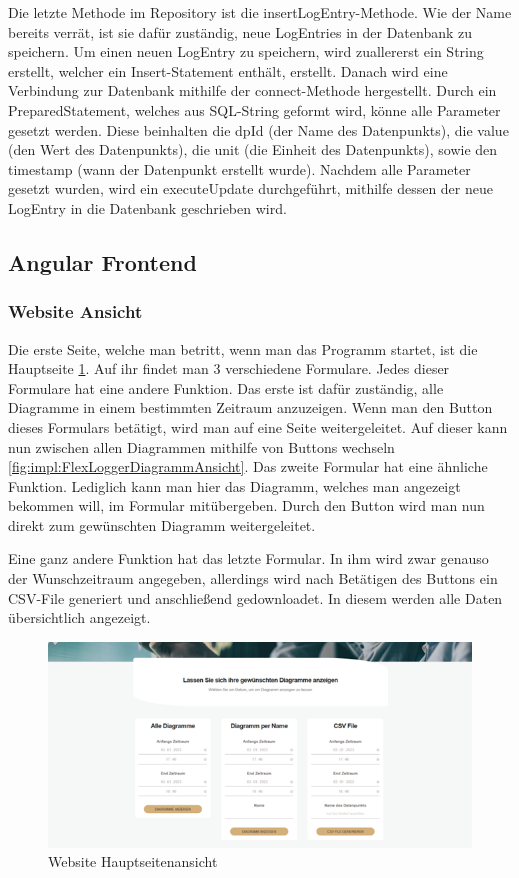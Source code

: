 Die letzte Methode im Repository ist die insertLogEntry-Methode. Wie der Name bereits verrät, ist sie dafür zuständig, neue LogEntries in der Datenbank zu speichern. Um einen neuen LogEntry zu speichern, wird zuallererst ein String erstellt, welcher ein Insert-Statement enthält, erstellt. 
Danach wird eine Verbindung zur Datenbank mithilfe der connect-Methode hergestellt. Durch ein PreparedStatement, welches aus SQL-String geformt wird, könne alle Parameter gesetzt werden. Diese beinhalten die dpId (der Name des Datenpunkts), die value (den Wert des Datenpunkts), die unit (die Einheit des Datenpunkts), sowie den timestamp (wann der Datenpunkt erstellt wurde). Nachdem alle Parameter gesetzt wurden, wird ein executeUpdate durchgeführt, mithilfe dessen der neue LogEntry in die Datenbank geschrieben wird. 

\subsection{Angular Frontend}
\subsubsection{Website Ansicht}
Die erste Seite, welche man betritt, wenn man das Programm startet, ist die Hauptseite \ref{fig:impl:FlexLoggerHauptseitenAnsicht}. Auf ihr findet man 3 verschiedene Formulare. Jedes dieser Formulare hat eine andere Funktion. Das erste ist dafür zuständig, alle Diagramme in einem bestimmten Zeitraum anzuzeigen. Wenn man den Button dieses Formulars betätigt, wird man auf eine Seite weitergeleitet. Auf dieser kann nun zwischen allen Diagrammen mithilfe von Buttons wechseln \ref{fig:impl:FlexLoggerDiagrammAnsicht}. Das zweite Formular hat eine ähnliche Funktion. Lediglich kann man hier das Diagramm, welches man angezeigt bekommen will, im Formular mitübergeben. Durch den Button wird man nun direkt zum gewünschten Diagramm weitergeleitet. 

Eine ganz andere Funktion hat das letzte Formular. In ihm wird zwar genauso der Wunschzeitraum angegeben, allerdings wird nach Betätigen des Buttons ein CSV-File generiert und anschließend gedownloadet. In diesem werden alle Daten übersichtlich angezeigt. 



\begin{figure}
    \centering
    \includegraphics[scale=0.5]{pics/FlexLoggerWebsiteFormulare.png}
    \caption{Website Hauptseitenansicht}
    \label{fig:impl:FlexLoggerHauptseitenAnsicht}
\end{figure}

